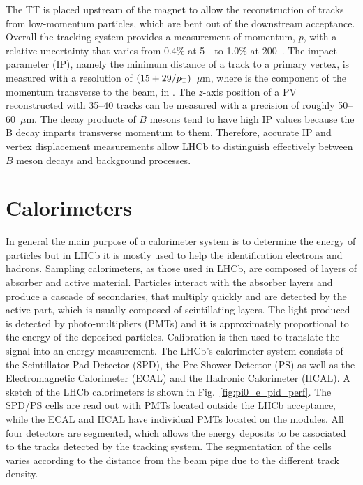 The TT is placed upstream of the magnet to allow the reconstruction of tracks from low-momentum particles,
which are bent out of the downstream acceptance. Overall the tracking system provides a measurement of momentum, 
$p$,  with a relative uncertainty that varies from 0.4\% at 5~\gevc~to 1.0\% at 200~\gevc. 
The impact parameter (IP), namely the minimum distance of a track to a primary vertex, is measured 
with a resolution of $(15 + 29/\mbox{$p_{\rm T}$})$~$\mu$m, where \pt is the component of the momentum transverse to the 
beam, in \gevc. The $z$-axis position of a PV reconstructed with 35--40 tracks can be measured with a precision 
of roughly 50--60~$\mu$m. The decay products of $B$ mesons tend to have high IP values because the B decay imparts
transverse momentum to them. Therefore, accurate IP and vertex displacement measurements allow LHCb to distinguish 
effectively between $B$ meson decays and background processes. 


\section{Calorimeters}
\label{sec:calorimeters}

In general the main purpose of a calorimeter system is to determine the energy of particles
but in LHCb it is mostly used to help the identification electrons and hadrons. 
Sampling calorimeters, as those used in LHCb, are composed of layers of absorber and active material.
Particles interact with the absorber layers and produce a cascade of secondaries, that multiply quickly and are detected by the active part,
which is usually composed of scintillating layers. The light produced is detected by photo-multipliers (PMTs) and it is approximately
proportional to the energy of the deposited particles. Calibration is then used to translate the signal into an energy measurement. 
The LHCb's calorimeter system consists of the Scintillator Pad Detector (SPD), the Pre-Shower Detector (PS)
as well as the Electromagnetic Calorimeter (ECAL) and the Hadronic Calorimeter (HCAL).
A sketch of the LHCb calorimeters is shown in Fig.~\ref{fig:pi0_e_pid_perf}. 
The SPD/PS cells are read out with PMTs located outside the LHCb acceptance, while the ECAL and HCAL
have individual PMTs located on the modules. All four detectors are segmented, which allows the energy
deposits to be associated to the tracks detected by the tracking system. The segmentation of the cells
varies according to the distance from the beam pipe due to the different track density.


